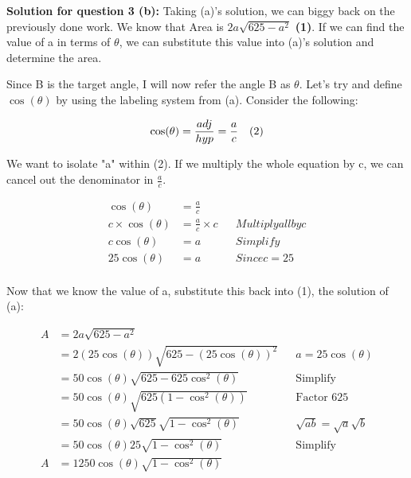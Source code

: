 \documentclass[12pt]{book}
\begin{document}
\begin{enumerate}
\newpage

\textbf{Solution for question 3 (b):}
\vspace{0.3cm}
Taking (a)'s solution, we can biggy back on the previously done work. We know that 
Area is $2a\sqrt{625 - a^2}$ \textbf{(1)}. If we can find the value of a in terms of $\theta$, 
we can substitute this value into (a)'s solution and determine the area.

\vspace{0.3cm}
Since B is the target angle, I will now refer the angle B as $\theta$. 
Let's try and define $\cos(\theta)$ by using the labeling system from (a). 
Consider the following:

$$\cos(\theta) = \frac{adj}{hyp} = \frac{a}{c} \text{\space \space \space (2)}$$

We want to isolate "a" within (2). If we multiply the whole equation by c, we can 
cancel out the denominator in $\frac{a}{c}$.

\begin{align*}
    \cos(\theta) &= \frac{a}{c} \\
    c \times \cos(\theta) &= \frac{a}{c} \times c && {Multiply all by c}\\
    c\cos(\theta) &= a && {Simplify}\\
    25\cos(\theta) &= a && {Since } c = 25\\
\end{align*}

\vspace{-0.5cm}
\begin{center}
    Now that we know the value of a, substitute this back into (1), the solution of (a):
\end{center}
\vspace{-0.5cm}

\begin{align*}
    A &= 2a\sqrt{625 - a^2} \\
    &= 2(25\cos(\theta))\sqrt{625 - (25\cos(\theta))^2} && a=25\cos(\theta)\\
    &= 50\cos(\theta)\sqrt{625 - 625\cos^2(\theta)} && \text{Simplify}\\
    &= 50\cos(\theta)\sqrt{625(1 - \cos^2(\theta))} && \text{Factor 625}\\
    &= 50\cos(\theta)\sqrt{625} \sqrt{1 - \cos^2(\theta)} && \sqrt{ab} = \sqrt{a}\sqrt{b}\\ %
    &= 50\cos(\theta)25 \sqrt{1 - \cos^2(\theta)} && \text{Simplify} \\
    A &= 1250\cos(\theta)\sqrt{1 - \cos^2(\theta)} \\
\end{align*}


\end{enumerate}
\end{document}
